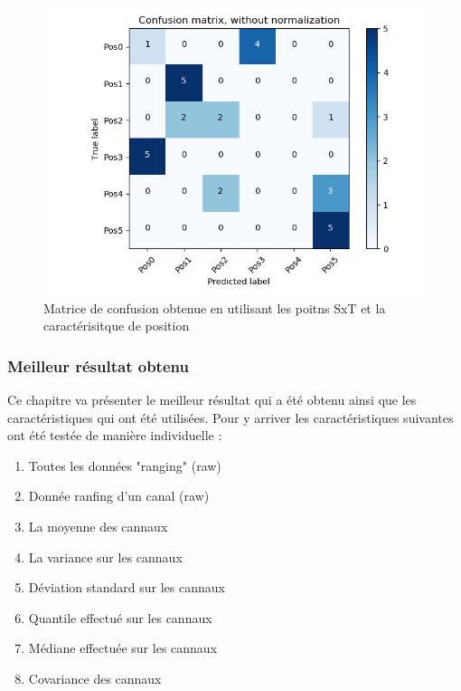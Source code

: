 \begin{figure}[htp]
	\begin{center}
		\includegraphics[scale=0.5]{figures/mat_pos_SxT_pos.png}
		\caption{Matrice de confusion obtenue en utilisant les poitns SxT et la caractérisitque de position}
		\label{fig:matPosSxTPos} %
	\end{center}
\end{figure}

\subsubsection{Meilleur résultat obtenu}
Ce chapitre va présenter le meilleur résultat qui a été obtenu ainsi que les caractéristiques qui ont été utilisées. Pour y arriver les caractéristiques suivantes ont été testée de manière individuelle :
 
\begin{enumerate}
	\item Toutes les données "ranging" (raw)
	\item Donnée ranfing d'un canal (raw) 
	\item La moyenne des cannaux
	\item La variance sur les cannaux
	\item Déviation standard sur les cannaux
	\item Quantile effectué sur les cannaux
	\item Médiane effectuée sur les cannaux 
	\item Covariance des cannaux
\end{enumerate}

